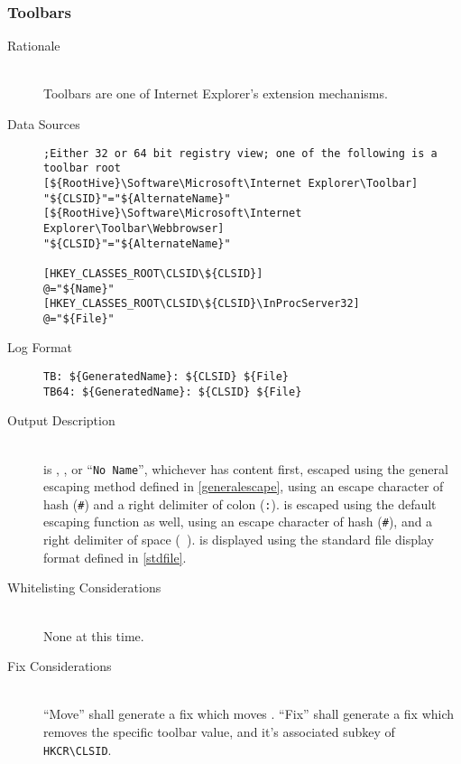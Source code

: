 \subsubsection{Toolbars}
\begin{description}
\item[Rationale] \hfill \\
Toolbars are one of Internet Explorer's extension mechanisms.
\item[Data Sources] \hfill
\vspace{-\baselineskip}
\begin{verbatim}
;Either 32 or 64 bit registry view; one of the following is a toolbar root
[${RootHive}\Software\Microsoft\Internet Explorer\Toolbar]
"${CLSID}"="${AlternateName}"
[${RootHive}\Software\Microsoft\Internet Explorer\Toolbar\Webbrowser]
"${CLSID}"="${AlternateName}"

[HKEY_CLASSES_ROOT\CLSID\${CLSID}]
@="${Name}"
[HKEY_CLASSES_ROOT\CLSID\${CLSID}\InProcServer32]
@="${File}"
\end{verbatim}
\item[Log Format] \hfill
\vspace{-\baselineskip}
\begin{verbatim}
TB: ${GeneratedName}: ${CLSID} ${File}
TB64: ${GeneratedName}: ${CLSID} ${File}
\end{verbatim}
\item[Output Description] \hfill \\
 is , , or ``\verb|No Name|'',
whichever has content first, escaped using the general escaping method defined
in \ref{generalescape}, using an escape character of hash (\verb|#|) and a right
delimiter of colon (\verb|:|).  is escaped using the default escaping
function as well, using an escape character of hash (\verb|#|), and a right
delimiter of space (\verb| |).  is displayed using the standard file
display format defined in \ref{stdfile}.
\item[Whitelisting Considerations] \hfill \\
None at this time.
\item[Fix Considerations] \hfill \\
``Move'' shall generate a fix which moves . ``Fix'' shall generate a
fix which removes the specific toolbar value, and it's associated subkey of
\verb|HKCR\CLSID|.
\end{description}

